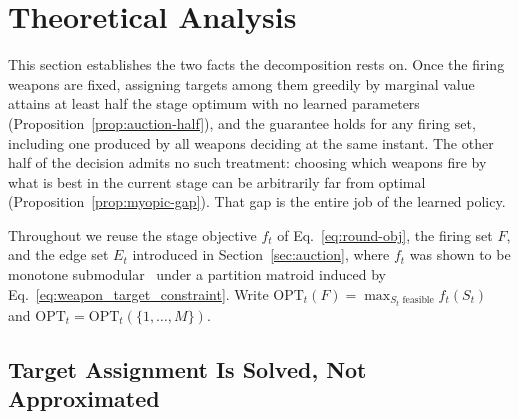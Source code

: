 \section{Theoretical Analysis}
\label{sec:submodular}

This section establishes the two facts the decomposition rests on. Once the
firing weapons are fixed, assigning targets among them greedily by marginal
value attains at least half the stage optimum with no learned parameters
(Proposition~\ref{prop:auction-half}), and the guarantee holds for any firing
set, including one produced by all weapons deciding at the same instant. The
other half of the decision admits no such treatment: choosing which weapons
fire by what is best in the current stage can be arbitrarily far from optimal
(Proposition~\ref{prop:myopic-gap}). That gap is the entire job of the learned
policy.

Throughout we reuse the stage objective $f_t$ of Eq.~\eqref{eq:round-obj},
the firing set $F$, and the edge set $E_t$ introduced in
Section~\ref{sec:auction}, where $f_t$ was shown to be monotone
submodular~\cite{wang2013weapon} under a partition matroid induced by
Eq.~\eqref{eq:weapon_target_constraint}. Write
$\text{OPT}_t(F) = \max_{S_t \text{ feasible}} f_t(S_t)$ and
$\text{OPT}_t = \text{OPT}_t(\{1,\ldots,M\})$.

\subsection{Target Assignment Is Solved, Not Approximated}

